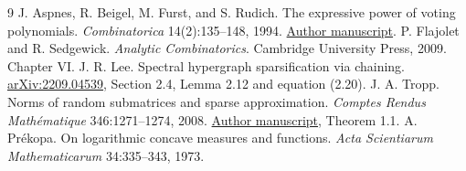 \documentclass[11pt]{article}
\theoremstyle{remark}\newtheorem{remark}[theorem]{Remark}
\begin{document}
\appendix


\begin{thebibliography}{9}
J. Aspnes, R. Beigel, M. Furst, and S. Rudich.
The expressive power of voting polynomials.
\emph{Combinatorica} 14(2):135--148, 1994.
\href{https://www.cs.yale.edu/homes/aspnes/papers/stoc91voting.pdf}{Author manuscript}.
P. Flajolet and R. Sedgewick. \emph{Analytic Combinatorics}.
Cambridge University Press, 2009. Chapter VI.
J. R. Lee. Spectral hypergraph sparsification via chaining.
\href{https://arxiv.org/abs/2209.04539}{arXiv:2209.04539},
Section 2.4, Lemma 2.12 and equation (2.20).
J. A. Tropp. Norms of random submatrices and sparse approximation.
\emph{Comptes Rendus Math\'ematique} 346:1271--1274, 2008.
\href{https://tropp.caltech.edu/papers/Tro08-Norms-Random-v3.pdf}{Author manuscript},
Theorem 1.1.
A. Pr\'ekopa. On logarithmic concave measures and functions.
\emph{Acta Scientiarum Mathematicarum} 34:335--343, 1973.
\end{thebibliography}
\end{document}

